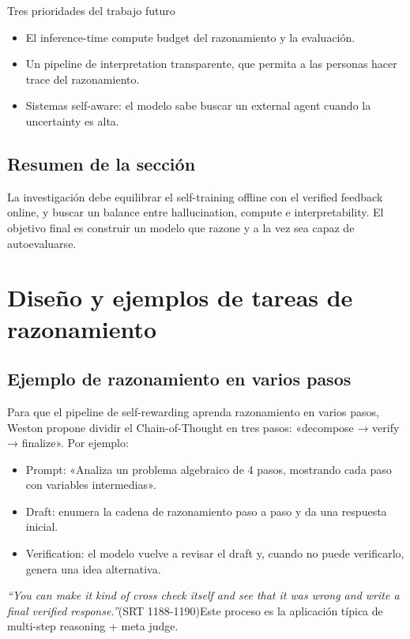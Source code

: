 \documentclass[a4paper]{article}
\begin{document}
\begin{importantbox}{Tres prioridades del trabajo futuro}
\begin{itemize}
    \item El inference-time compute budget del razonamiento y la evaluación.
    \item Un pipeline de interpretation transparente, que permita a las personas hacer trace del razonamiento.
    \item Sistemas self-aware: el modelo sabe buscar un external agent cuando la uncertainty es alta.
\end{itemize}
\end{importantbox}

\subsection{Resumen de la sección}
La investigación debe equilibrar el self-training offline con el verified feedback online, y buscar un balance entre hallucination, compute e interpretability. El objetivo final es construir un modelo que razone y a la vez sea capaz de autoevaluarse.

\section{Diseño y ejemplos de tareas de razonamiento}
\subsection{Ejemplo de razonamiento en varios pasos}
Para que el pipeline de self-rewarding aprenda razonamiento en varios pasos, Weston propone dividir el Chain-of-Thought en tres pasos: «decompose → verify → finalize». Por ejemplo:
\begin{itemize}
    \item Prompt: «Analiza un problema algebraico de 4 pasos, mostrando cada paso con variables intermedias».
    \item Draft: enumera la cadena de razonamiento paso a paso y da una respuesta inicial.
    \item Verification: el modelo vuelve a revisar el draft y, cuando no puede verificarlo, genera una idea alternativa.
\end{itemize}
\textit{``You can make it kind of cross check itself and see that it was wrong and write a final verified response.''}(SRT 1188-1190)Este proceso es la aplicación típica de multi-step reasoning + meta judge.
\end{document}
